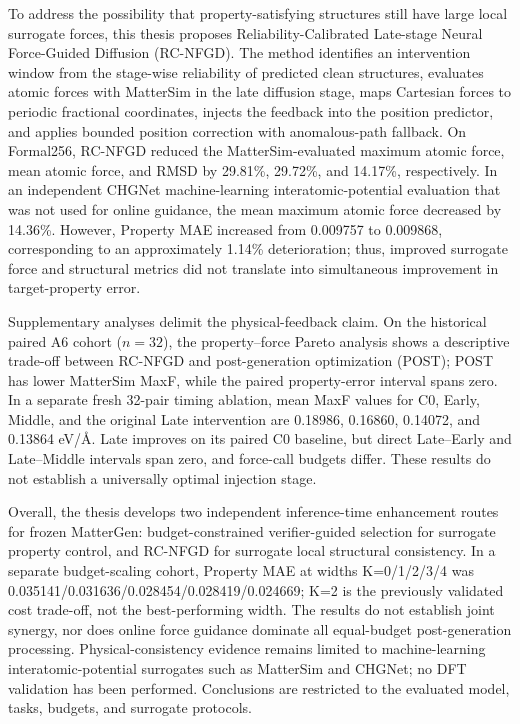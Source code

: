 \begin{EnglishAbstract}
To address the possibility that property-satisfying structures still have large local surrogate forces, this thesis proposes Reliability-Calibrated Late-stage Neural Force-Guided Diffusion (RC-NFGD). The method identifies an intervention window from the stage-wise reliability of predicted clean structures, evaluates atomic forces with MatterSim in the late diffusion stage, maps Cartesian forces to periodic fractional coordinates, injects the feedback into the position predictor, and applies bounded position correction with anomalous-path fallback. On Formal256, RC-NFGD reduced the MatterSim-evaluated maximum atomic force, mean atomic force, and RMSD by 29.81\%, 29.72\%, and 14.17\%, respectively. In an independent CHGNet machine-learning interatomic-potential evaluation that was not used for online guidance, the mean maximum atomic force decreased by 14.36\%. However, Property MAE increased from 0.009757 to 0.009868, corresponding to an approximately 1.14\% deterioration; thus, improved surrogate force and structural metrics did not translate into simultaneous improvement in target-property error.

Supplementary analyses delimit the physical-feedback claim. On the historical paired A6 cohort ($n=32$), the property--force Pareto analysis shows a descriptive trade-off between RC-NFGD and post-generation optimization (POST); POST has lower MatterSim MaxF, while the paired property-error interval spans zero. In a separate fresh 32-pair timing ablation, mean MaxF values for C0, Early, Middle, and the original Late intervention are 0.18986, 0.16860, 0.14072, and 0.13864 eV/\AA. Late improves on its paired C0 baseline, but direct Late--Early and Late--Middle intervals span zero, and force-call budgets differ. These results do not establish a universally optimal injection stage.


Overall, the thesis develops two independent inference-time enhancement routes for frozen MatterGen: budget-constrained verifier-guided selection for surrogate property control, and RC-NFGD for surrogate local structural consistency. In a separate budget-scaling cohort, Property MAE at widths K=0/1/2/3/4 was 0.035141/0.031636/0.028454/0.028419/0.024669; K=2 is the previously validated cost trade-off, not the best-performing width. The results do not establish joint synergy, nor does online force guidance dominate all equal-budget post-generation processing. Physical-consistency evidence remains limited to machine-learning interatomic-potential surrogates such as MatterSim and CHGNet; no DFT validation has been performed. Conclusions are restricted to the evaluated model, tasks, budgets, and surrogate protocols.

\end{EnglishAbstract}
